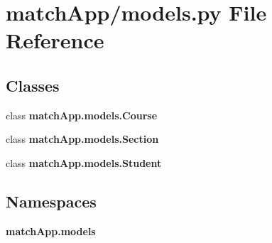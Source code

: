 \section{match\+App/models.py File Reference}
\label{models_8py}
\subsection*{Classes}
\begin{DoxyCompactItemize}
\item 
class {\bf match\+App.\+models.\+Course}
\item 
class {\bf match\+App.\+models.\+Section}
\item 
class {\bf match\+App.\+models.\+Student}
\end{DoxyCompactItemize}
\subsection*{Namespaces}
\begin{DoxyCompactItemize}
\item 
 {\bf match\+App.\+models}
\end{DoxyCompactItemize}
